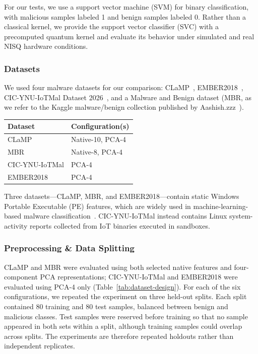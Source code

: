 \documentclass[letterpaper]{article} %
\begin{document}
For our tests, we use a support vector machine (SVM) for binary classification, with malicious samples labeled 1 and benign samples labeled 0. Rather than a classical kernel, we provide the support vector classifier (SVC) with a precomputed quantum kernel and evaluate its behavior under simulated and real NISQ hardware conditions.

\subsubsection{Datasets}

We used four malware datasets for our comparison: CLaMP~\cite{clamp}, EMBER2018~\cite{ember2018}, CIC-YNU-IoTMal Dataset 2026~\cite{cic}, and a Malware and Benign dataset (MBR, as we refer to the Kaggle malware/benign collection published by Aashish.zzz~\cite{synthetic}).

\begin{center}
\label{tab:dataset-design}
\small
\begin{tabular}{ll}
\toprule
Dataset & Configuration(s) \\
\midrule
CLaMP & Native-10, PCA-4 \\
MBR & Native-8, PCA-4 \\
CIC-YNU-IoTMal & PCA-4 \\
EMBER2018 & PCA-4 \\
\bottomrule
\end{tabular}
\end{center}

Three datasets---CLaMP, MBR, and EMBER2018---contain static Windows Portable Executable (PE) features, which are widely used in machine-learning-based malware classification~\cite{ucci2019survey}. CIC-YNU-IoTMal instead contains Linux system-activity reports collected from IoT binaries executed in sandboxes.

\subsubsection{Preprocessing \& Data Splitting}
CLaMP and MBR were evaluated using both selected native features and four-component PCA representations; CIC-YNU-IoTMal and EMBER2018 were evaluated using PCA-4 only (Table~\ref{tab:dataset-design}). For each of the six configurations, we repeated the experiment on three held-out splits. Each split contained 80 training and 80 test samples, balanced between benign and malicious classes. Test samples were reserved before training so that no sample appeared in both sets within a split, although training samples could overlap across splits. The experiments are therefore repeated holdouts rather than independent replicates.
\end{document}
